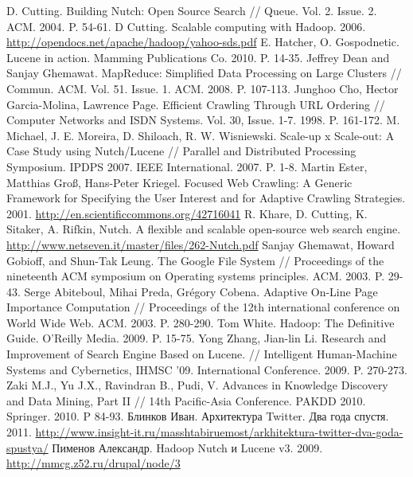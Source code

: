 \documentclass[a4paper,10pt]{report}
\begin{document}
\begin{thebibliography}{9}
 D. Cutting. Building Nutch: Open Source Search // Queue. Vol. 2. Issue. 2. ACM. 2004. P. 54-61.
 D Cutting. Scalable computing with Hadoop. 2006. \href{http://opendocs.net/apache/hadoop/yahoo-sds.pdf}{http://opendocs.net/apache/hadoop/yahoo-sds.pdf}
 E. Hatcher, O. Gospodnetic. Lucene in action. Mamming Publications Co. 2010. P. 14-35.
 Jeffrey Dean and Sanjay Ghemawat. MapReduce: Simplified Data Processing on Large Clusters // Commun. ACM. Vol. 51. Issue. 1. ACM. 2008. P. 107-113.
 Junghoo Cho, Hector Garcia-Molina, Lawrence Page. Efficient Crawling Through URL Ordering // Computer Networks and ISDN Systems. Vol. 30, Issue. 1-7. 1998. P. 161-172.
 M. Michael, J. E. Moreira, D. Shiloach, R. W. Wisniewski. Scale-up x Scale-out: A Case Study using Nutch/Lucene // Parallel and Distributed Processing Symposium. IPDPS 2007. IEEE International. 2007. P. 1-8.
 Martin Ester, Matthias Groß, Hans-Peter Kriegel. Focused Web Crawling: A Generic Framework for Specifying the User Interest and for Adaptive Crawling Strategies. 2001. \href{http://en.scientificcommons.org/42716041}{http://en.scientificcommons.org/42716041}
 R. Khare, D. Cutting, K. Sitaker, A. Rifkin, Nutch. A flexible and scalable open-source web search engine. \href{http://www.netseven.it/master/files/262-Nutch.pdf}{http://www.netseven.it/master/files/262-Nutch.pdf}
 Sanjay Ghemawat, Howard Gobioff, and Shun-Tak Leung. The Google File System // Proceedings of the nineteenth ACM symposium on Operating systems principles. ACM. 2003. P. 29-43.
 Serge Abiteboul, Mihai Preda, Grégory Cobena. Adaptive On-Line Page Importance Computation // Proceedings of the 12th international conference on World Wide Web. ACM. 2003. P. 280-290.
 Tom White. Hadoop: The Definitive Guide. O'Reilly Media. 2009. P. 15-75.
 Yong Zhang, Jian-lin Li. Research and Improvement of Search Engine Based on Lucene. // Intelligent Human-Machine Systems and Cybernetics, IHMSC '09. International Conference. 2009. P. 270-273.
 Zaki M.J., Yu J.X., Ravindran B., Pudi, V. Advances in Knowledge Discovery and Data Mining, Part II // 14th Pacific-Asia Conference. PAKDD 2010. Springer. 2010. P 84-93. 
 Блинков Иван. Архитектура Twitter. Два года спустя. 2011. \href{http://www.insight-it.ru/masshtabiruemost/arkhitektura-twitter-dva-goda-spustya/}{http://www.insight-it.ru/masshtabiruemost/arkhitektura-twitter-dva-goda-spustya/}
 Пименов Александр. Hadoop Nutch и Lucene v3. 2009. \href{http://mmcg.z52.ru/drupal/node/3}{http://mmcg.z52.ru/drupal/node/3}

\end{thebibliography}
\end{document}
